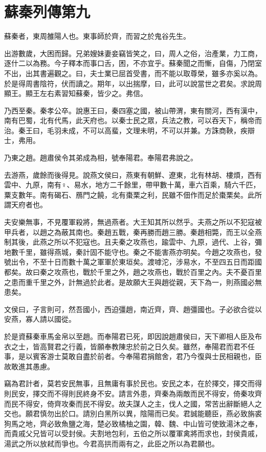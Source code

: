 \chapter{蘇秦列傳第九}

蘇秦者，東周雒陽人也。東事師於齊，而習之於鬼谷先生。

出游數歲，大困而歸。兄弟嫂妹妻妾竊皆笑之，曰，周人之俗，治產業，力工商，逐什二以為務。今子釋本而事口舌，困，不亦宜乎。蘇秦聞之而慚，自傷，乃閉室不出，出其書遍觀之。曰，夫士業已屈首受書，而不能以取尊榮，雖多亦奚以為。於是得周書陰符，伏而讀之。期年，以出揣摩，曰，此可以說當世之君矣。求說周顯王。顯王左右素習知蘇秦，皆少之。弗信。

乃西至秦。秦孝公卒。說惠王曰，秦四塞之國，被山帶渭，東有關河，西有漢中，南有巴蜀，北有代馬，此天府也。以秦士民之眾，兵法之教，可以吞天下，稱帝而治。秦王曰，毛羽未成，不可以高蜚，文理未明，不可以并兼。方誅商鞅，疾辯士，弗用。

乃東之趙。趙肅侯令其弟成為相，號奉陽君。奉陽君弗說之。

去游燕，歲餘而後得見。說燕文侯曰，燕東有朝鮮、遼東，北有林胡、樓煩，西有雲中、九原，南有♀、易水，地方二千餘里，帶甲數十萬，車六百乘，騎六千匹，粟支數年。南有碣石、鴈門之饒，北有棗栗之利，民雖不佃作而足於棗栗矣。此所謂天府者也。

夫安樂無事，不見覆軍殺將，無過燕者。大王知其所以然乎。夫燕之所以不犯寇被甲兵者，以趙之為蔽其南也。秦趙五戰，秦再勝而趙三勝。秦趙相斃，而王以全燕制其後，此燕之所以不犯寇也。且夫秦之攻燕也，踰雲中、九原，過代、上谷，彌地數千里，雖得燕城，秦計固不能守也。秦之不能害燕亦明矣。今趙之攻燕也，發號出令，不至十日而數十萬之軍軍於東垣矣。渡嘑沱，涉易水，不至四五日而距國都矣。故曰秦之攻燕也，戰於千里之外，趙之攻燕也，戰於百里之內。夫不憂百里之患而重千里之外，計無過於此者。是故願大王與趙從親，天下為一，則燕國必無患矣。

文侯曰，子言則可，然吾國小，西迫彊趙，南近齊，齊、趙彊國也。子必欲合從以安燕，寡人請以國從。

於是資蘇秦車馬金帛以至趙。而奉陽君已死，即因說趙肅侯曰，天下卿相人臣及布衣之士，皆高賢君之行義，皆願奉教陳忠於前之日久矣。雖然，奉陽君而君不任事，是以賓客游士莫敢自盡於前者。今奉陽君捐館舍，君乃今復與士民相親也，臣故敢進其愚慮。

竊為君計者，莫若安民無事，且無庸有事於民也。安民之本，在於擇交，擇交而得則民安，擇交而不得則民終身不安。請言外患，齊秦為兩敵而民不得安，倚秦攻齊而民不得安，倚齊攻秦而民不得安。故夫謀人之主，伐人之國，常苦出辭斷絕人之交也。願君慎勿出於口。請別白黑所以異，陰陽而已矣。君誠能聽臣，燕必致旃裘狗馬之地，齊必致魚鹽之海，楚必致橘柚之園，韓、魏、中山皆可使致湯沐之奉，而貴戚父兄皆可以受封侯。夫割地包利，五伯之所以覆軍禽將而求也，封侯貴戚，湯武之所以放弒而爭也。今君高拱而兩有之，此臣之所以為君願也。

